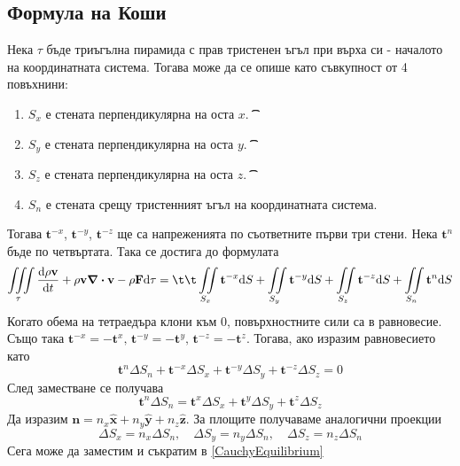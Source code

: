 \subsection{Формула на Коши}
Нека $\tau$ бъде триъгълна пирамида с прав тристенен ъгъл при върха си - началото на координатната система.
Тогава може да се опише като съвкупност от 4 повъхнини:
\begin{enumerate}
  \item $S_x$ е стената перпендикулярна на оста $x$.
\t\t\item $S_y$ е стената перпендикулярна на оста $y$.
\t\t\item $S_z$ е стената перпендикулярна на оста $z$.
\t\t\item $S_n$ е стената срещу тристенният ъгъл на координатната система.
\end{enumerate}
Тогава $\mathbf{t}^{-x}$, $\mathbf{t}^{-y}$, $\mathbf{t}^{-z}$ ще са напреженията по съответните първи три стени.
Нека $\mathbf{t}^{n}$ бъде по четвъртата. Така се достига до формулата
\begin{equation}
  \iiint\limits_{\tau} \dv{\rho \mathbf{v}}{t} + \rho \mathbf{v} \div \mathbf{v} - \rho \mathbf{F} \dd \tau =
\t\t\iint\limits_{S_x} \mathbf{t}^{-x} \dd S + \iint\limits_{S_y} \mathbf{t}^{-y} \dd S + \iint\limits_{S_z} \mathbf{t}^{-z} \dd S + \iint\limits_{S_n} \mathbf{t}^{n} \dd S
\end{equation}
Когато обема на тетраедъра клони към $0$, повърхностните сили са в равновесие.
Също така $\mathbf{t}^{-x} = - \mathbf{t}^{x},\, \mathbf{t}^{-y} = - \mathbf{t}^{y},\, \mathbf{t}^{-z} = - \mathbf{t}^{z}$.
Тогава, ако изразим равновесието като
\begin{equation}
  \mathbf{t}^{n} \Delta S_n + \mathbf{t}^{-x} \Delta S_x + \mathbf{t}^{-y} \Delta S_y + \mathbf{t}^{-z} \Delta S_z = 0
\end{equation}
След заместване се получава
\begin{equation}
  \label{CauchyEquilibrium} \mathbf{t}^{n} \Delta S_n = \mathbf{t}^{x} \Delta S_x + \mathbf{t}^{y} \Delta S_y + \mathbf{t}^{z} \Delta S_z
\end{equation}
Да изразим $\mathbf{n} = n_x \hat{\mathbf{x}} + n_y \hat{\mathbf{y}} + n_z \hat{\mathbf{z}}$.
За площите получаваме аналогични проекции
\begin{equation}
  \Delta S_x = n_x \Delta S_n,\quad \Delta S_y = n_y \Delta S_n,\quad \Delta S_z = n_z \Delta S_n
\end{equation}
Сега може да заместим и съкратим в \eqref{CauchyEquilibrium}

